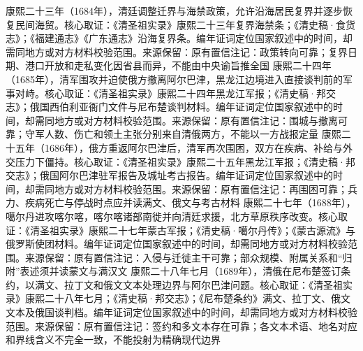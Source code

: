 康熙二十三年（1684年），清廷调整迁界与海禁政策，允许沿海居民复界并逐步恢复民间海贸。核心取证：《清圣祖实录》康熙二十三年复界海禁条；《清史稿·食货志》；《福建通志》《广东通志》沿海复界条。编年证词定位国家叙述中的时间，却需同地方或对方材料校验范围。来源保留：原有置信注记：政策转向可靠；复界日期、港口开放和走私变化因省县而异，不能由中央谕旨推全国
康熙二十四年（1685年），清军围攻并迫使俄方撤离阿尔巴津，黑龙江边境进入直接谈判前的军事对峙。核心取证：《清圣祖实录》康熙二十四年黑龙江军报；《清史稿·邦交志》；俄国西伯利亚衙门文件与尼布楚谈判材料。编年证词定位国家叙述中的时间，却需同地方或对方材料校验范围。来源保留：原有置信注记：围城与撤离可靠；守军人数、伤亡和领土主张分别来自清俄两方，不能以一方战报定量
康熙二十五年（1686年），俄方重返阿尔巴津后，清军再次围困，双方在疾病、补给与外交压力下僵持。核心取证：《清圣祖实录》康熙二十五年黑龙江军报；《清史稿·邦交志》；俄国阿尔巴津驻军报告及城址考古报告。编年证词定位国家叙述中的时间，却需同地方或对方材料校验范围。来源保留：原有置信注记：再围困可靠；兵力、疾病死亡与停战时点应并读满文、俄文与考古材料
康熙二十七年（1688年），噶尔丹进攻喀尔喀，喀尔喀诸部南徙并向清廷求援，北方草原秩序改变。核心取证：《清圣祖实录》康熙二十七年蒙古军报；《清史稿·噶尔丹传》；《蒙古源流》与俄罗斯使团材料。编年证词定位国家叙述中的时间，却需同地方或对方材料校验范围。来源保留：原有置信注记：入侵与迁徙主干可靠；部众规模、附属关系和“归附”表述须并读蒙文与满汉文
康熙二十八年七月（1689年），清俄在尼布楚签订条约，以满文、拉丁文和俄文文本处理边界与阿尔巴津问题。核心取证：《清圣祖实录》康熙二十八年七月；《清史稿·邦交志》；《尼布楚条约》满文、拉丁文、俄文文本及俄国谈判档。编年证词定位国家叙述中的时间，却需同地方或对方材料校验范围。来源保留：原有置信注记：签约和多文本存在可靠；各文本术语、地名对应和界线含义不完全一致，不能投射为精确现代边界
